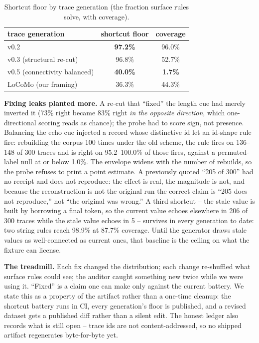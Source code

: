 \documentclass[11pt]{article}
\begin{document}
\begin{table}[h]
\centering
\caption{Shortcut floor by trace generation (the fraction surface rules solve, with coverage).}
\label{tab:floor}
\begin{tabular}{lcc}
\toprule
trace generation & shortcut floor & coverage \\
\midrule
v0.2 & \textbf{97.2\%} & 96.0\% \\
v0.3 (structural re-cut) & 96.8\% & 52.7\% \\
v0.5 (connectivity balanced) & \textbf{40.0\%} & \textbf{1.7\%} \\
LoCoMo (our framing) & 36.3\% & 44.3\% \\
\bottomrule
\end{tabular}
\end{table}

\textbf{Fixing leaks planted more.} A re-cut that ``fixed'' the length cue had merely inverted it
(73\% right became 83\% right \emph{in the opposite direction}, which one-directional scoring reads as
chance); the probe had to score sign, not presence. Balancing the echo cue injected a record whose
distinctive id let an id-shape rule fire: rebuilding the corpus 100 times under the old scheme, the
rule fires on 136--148 of 300 traces and is right on 95.2--100.0\% of those fires, against a
permuted-label null at or below 1.0\%. The envelope widens with the number of rebuilds, so the probe
refuses to print a point estimate. A previously quoted ``205 of 300'' had no receipt and does not
reproduce: the effect is real, the magnitude is not, and because the reconstruction is not the original
run the correct claim is ``205 does not reproduce,'' not ``the original was wrong.'' A third shortcut
-- the stale value is built by borrowing a final token, so the current value echoes elsewhere in 206 of
300 traces while the stale value echoes in 5 -- survives in every generation to date: two string rules
reach 98.9\% at 87.7\% coverage. Until the generator draws stale values as well-connected as current
ones, that baseline is the ceiling on what the fixture can license.

\textbf{The treadmill.} Each fix changed the distribution; each change re-shuffled what surface rules
could see; the auditor caught something new twice while we were using it. ``Fixed'' is a claim one can
make only against the current battery. We state this as a property of the artifact rather than a one-time
cleanup: the shortcut battery runs in CI, every generation's floor is published, and a revised dataset
gets a published diff rather than a silent edit. The honest ledger also records what is still open --
trace ids are not content-addressed, so no shipped artifact regenerates byte-for-byte yet.
\end{document}

